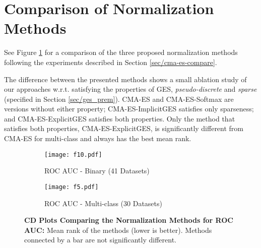 \documentclass[11pt]{article}
\newcommand{\nbc}[3]{
		{\colorbox{#3}{\bfseries\sffamily\scriptsize\textcolor{white}{#1}}}
		{\textcolor{#3}{\sf\small$\blacktriangleright$\textit{#2}$\blacktriangleleft$}}
}
\newcommand{\changed}[1]{\nbc{CHANGED}{#1}{changedcolor}}
\renewcommand{\changed}[1]{{\color{changedcolor}#1}}
\renewcommand{\changed}[1]{{#1}}
\begin{document}
{\begin{table}[h]
{\begin{subtable}[h]{0.48\textwidth}
    \end{subtable}
    \hfill
        \begin{subtable}[h]{0.48\textwidth}
        \centering
        \caption{ROC AUC - Multi-class}

    \end{subtable}
    } %
    
\end{table}
} %

\section{Comparison of Normalization Methods}
\label{apdx/norm_method_comprae}
See Figure \ref{fig/cd_plot2} for a comparison of the three proposed normalization methods following the experiments described in Section \ref{sec/cma-es-compare}.

\changed{
The difference between the presented methods shows a small ablation study of our approaches w.r.t. satisfying the properties of GES, \emph{pseudo-discrete} and \emph{sparse} (specified in Section \ref{sec/ges_prem}).
CMA-ES and CMA-ES-Softmax are versions without either property; CMA-ES-ImplicitGES satisfies only sparseness; and CMA-ES-ExplicitGES satisfies both properties. 
Only the method that satisfies both properties, CMA-ES-ExplicitGES, is significantly different from CMA-ES for multi-class and always has the best mean rank. 
}

\begin{figure}[h]
    \begin{subfigure}[t]{0.49\linewidth}
    \centering
    \texttt{[image: f10.pdf]}
    \caption{ROC AUC - Binary \changed{(41 Datasets)}}
    \end{subfigure}
    \begin{subfigure}[t]{0.49\linewidth}
        \centering
        \texttt{[image: f5.pdf]}
        \caption{ROC AUC - Multi-class  \changed{(30 Datasets)}}
    \end{subfigure}

  
    \caption{\textbf{CD Plots Comparing the Normalization Methods for ROC AUC:{} }{\normalfont Mean rank of the methods (lower is better). Methods connected by a bar are not significantly different.}
    }
    \label{fig/cd_plot2}
\end{figure}
\end{document}
